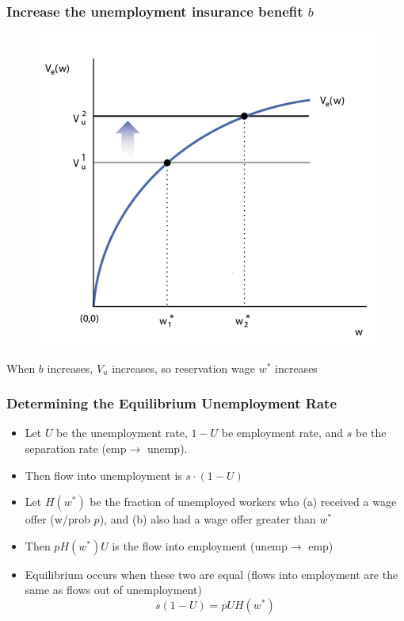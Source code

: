 \documentclass{beamer}
\begin{document}
\begin{frame}
\frametitle[alignment=center]{Increase the unemployment insurance benefit $b$}
\begin{figure}
\centering
\includegraphics[scale=0.5]{Figures/W_Fig_6pt11.png}
\end{figure}
When $b$ increases, $V_u$ increases, so reservation wage $w^*$ increases
\end{frame}


\begin{frame}
\frametitle[alignment=center]{Determining the Equilibrium Unemployment Rate}
\begin{itemize}
\item Let $U$ be the unemployment rate, $1-U$ be employment rate, and $s$ be the separation rate (emp$\rightarrow$ unemp). 
\bigskip
\item  Then flow into unemployment is $s\cdot (1-U)$
\bigskip
\item Let $H(w^*)$ be the fraction of unemployed workers who (a) received a wage offer (w/prob $p$), and (b) also had a wage offer greater than $w^*$ 
\bigskip
\item Then $pH(w^*)U$ is the flow into employment (unemp$\rightarrow$ emp)
\bigskip
\item Equilibrium occurs when these two are equal (flows into employment are the same as flows out of unemployment)
$$s(1-U)=pUH(w^*)$$
\end{itemize}
\end{frame}
\end{document}
